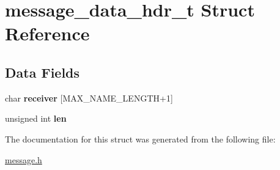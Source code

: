 \hypertarget{structmessage__data__hdr__t}{}\section{message\+\_\+data\+\_\+hdr\+\_\+t Struct Reference}
\label{structmessage__data__hdr__t}
\subsection*{Data Fields}
\begin{DoxyCompactItemize}
\item 
\mbox{\label{structmessage__data__hdr__t_aabb098b2d9fd9305abddad8893b38843}} 
char {\bfseries receiver} \mbox{[}M\+A\+X\+\_\+\+N\+A\+M\+E\+\_\+\+L\+E\+N\+G\+TH+1\mbox{]}
\item 
\mbox{\label{structmessage__data__hdr__t_a77124bd5f7e31e6fffc19f335da0c23f}} 
unsigned int {\bfseries len}
\end{DoxyCompactItemize}


The documentation for this struct was generated from the following file\+:\begin{DoxyCompactItemize}
\item 
\hyperlink{message_8h}{message.\+h}\end{DoxyCompactItemize}
